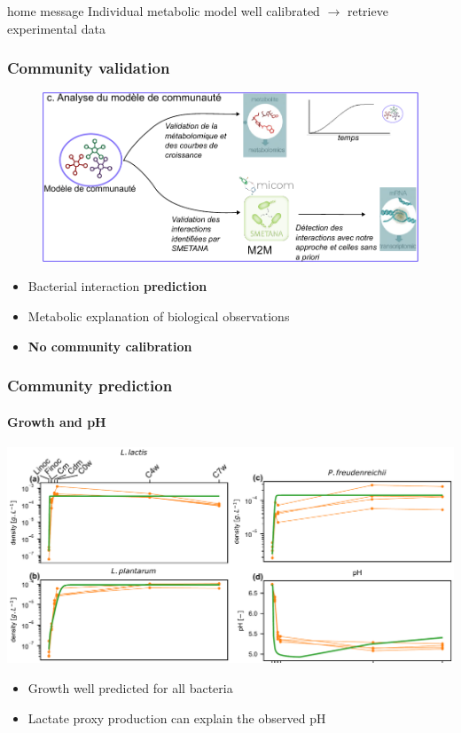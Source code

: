 \documentclass[8pt]{beamer}
\begin{document}
\begin{frame}
{}

\begin{block}{home message}
Individual metabolic model well calibrated $\rightarrow$ retrieve experimental data
\end{block}

\end{frame}

\begin{frame}
\frametitle{Community validation}

\begin{figure}
\includegraphics[width=\textwidth]{figures/com-validation.pdf}
\end{figure}
\begin{block}{}
\begin{itemize}
\item Bacterial interaction \textbf{prediction}
\item Metabolic explanation of biological observations
\item \textbf{No community calibration}
\end{itemize}
\end{block}
\end{frame}

\begin{frame}
\frametitle{Community prediction}
\framesubtitle{Growth and pH}

\includegraphics[width=\textwidth]{figures/community-pred-growth.pdf}
\begin{block}{}
\begin{itemize}
\item Growth well predicted for all bacteria
\item Lactate proxy production can explain the observed pH
\end{itemize}
\end{block}
\end{frame}
\end{document}
